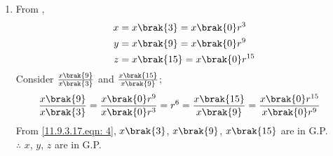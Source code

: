 \documentclass[journal,12pt,twocolumn]{IEEEtran}
\theoremstyle{remark}
\begin{document}
\begin{enumerate}
\item From ,
\begin{align}
    x&= x\brak{3} =x\brak{0}r^3 \\
	y&=x\brak{9}=x\brak{0}r^{9} \\
	z&=x\brak{15}=x\brak{0}r^{15}
\end{align}
Consider $\frac{x\brak{9}}{x\brak{3}}$ and $\frac{x\brak{15}}{x\brak{9}}$;
\begin{align}
	\frac{x\brak{9}}{x\brak{3}} &= \frac{x\brak{0}r^{9}}{x\brak{0}r^3} = r^6 = \frac{x\brak{15}}{x\brak{9}} = \frac{x\brak{0}r^{15}}{x\brak{0}r^{9}}\label{11.9.3.17.eqn: 4}
\end{align}
From \eqref{11.9.3.17.eqn: 4}, $x\brak{3}$, $x\brak{9}$, $x\brak{15}$ are in G.P.\\
$\therefore$  $x$, $y$, $z$ are in G.P.\\


\end{enumerate}
\end{document}

